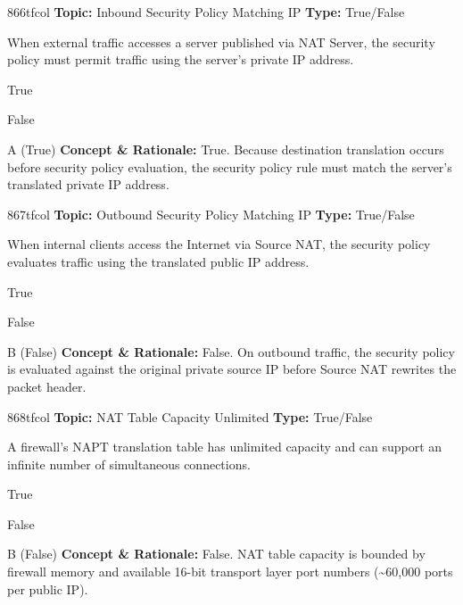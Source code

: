 \begin{qcard}{866}{tfcol}
\textcolor{darkslate!75}{\small\textbf{Topic:} Inbound Security Policy Matching IP \hfill \textbf{Type:} True/False}\vspace{0.4em}\par
When external traffic accesses a server published via NAT Server, the security policy must permit traffic using the server's private IP address.
\begin{qoptions}
\item True
\item False
\end{qoptions}
\end{qcard}
\nopagebreak
\begin{explainbox}{A (True)}
\textbf{Concept \& Rationale:} True. Because destination translation occurs before security policy evaluation, the security policy rule must match the server's translated private IP address.
\end{explainbox}

\begin{qcard}{867}{tfcol}
\textcolor{darkslate!75}{\small\textbf{Topic:} Outbound Security Policy Matching IP \hfill \textbf{Type:} True/False}\vspace{0.4em}\par
When internal clients access the Internet via Source NAT, the security policy evaluates traffic using the translated public IP address.
\begin{qoptions}
\item True
\item False
\end{qoptions}
\end{qcard}
\nopagebreak
\begin{explainbox}{B (False)}
\textbf{Concept \& Rationale:} False. On outbound traffic, the security policy is evaluated against the original private source IP before Source NAT rewrites the packet header.
\end{explainbox}

\begin{qcard}{868}{tfcol}
\textcolor{darkslate!75}{\small\textbf{Topic:} NAT Table Capacity Unlimited \hfill \textbf{Type:} True/False}\vspace{0.4em}\par
A firewall's NAPT translation table has unlimited capacity and can support an infinite number of simultaneous connections.
\begin{qoptions}
\item True
\item False
\end{qoptions}
\end{qcard}
\nopagebreak
\begin{explainbox}{B (False)}
\textbf{Concept \& Rationale:} False. NAT table capacity is bounded by firewall memory and available 16-bit transport layer port numbers (\textasciitilde{}60,000 ports per public IP).
\end{explainbox}

